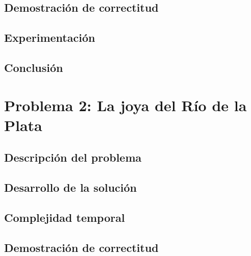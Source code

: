 \documentclass[a4paper, 10pt, twoside]{article}
\begin{document}
\label{problema1-demostracion}
\subsection{Demostración de correctitud}


\subsection{Experimentación}
\label{problema1-experimentacion}


\subsection{Conclusión}
\label{problema1-resultados}


\newpage



\section{Problema 2: La joya del Río de la Plata}

\subsection{Descripción del problema}
\label{problema2-descripcion}


\subsection{Desarrollo de la solución}
\label{problema2-desarrollo}


\subsection{Complejidad temporal}
\label{problema2-complejidad}


\label{problema2-demostracion}
\subsection{Demostración de correctitud}

\end{document}
